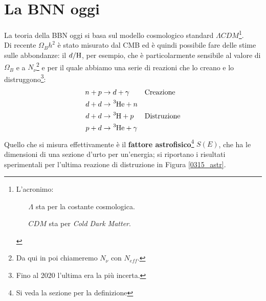 \section{La BNN oggi}
La teoria della BBN oggi si basa sul modello cosmologico standard $\Lambda CDM$\footnote{L'acronimo:%
\begin{itemize}
    \item[$\Lambda$] sta per la costante cosmologica.
    \item[$CDM$] sta per \textit{Cold Dark Matter}.
\end{itemize}
}.\\
Di recente $\Omega_B h^2$ è stato misurato dal CMB ed è quindi possibile fare delle stime sulle abbondanze: il $d/\ce{H}$, per esempio, che è particolarmente sensibile al valore di $\Omega_B$ e a $N_\nu$\footnote{Da qui in poi chiameremo $N_\nu$ con $N_{eff}$.} e per il quale abbiamo una serie di reazioni che lo creano e lo distruggono\footnote{Fino al 2020 l'ultima era la più incerta.}:
\begin{displaymath}
\begin{aligned}
n + p &\to d + \gamma & &\text{Creazione} \\
d + d &\to \ce{^3He} + n & \\
d + d &\to \ce{^3H}  + p &  &\text{Distruzione} \\
p + d &\to \ce{^3He} + \gamma & 
\end{aligned}
\end{displaymath}
Quello che si misura effettivamente è il \textbf{fattore astrofisico}\footnote{Si veda la sezione  per la definizione} $S(E)$, che ha le dimensioni di una sezione d'urto per un'energia; si riportano i risultati sperimentali per l'ultima reazione di distruzione in Figura \ref{0315_astr}.

